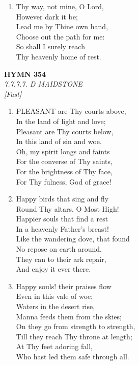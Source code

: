 \begin{enumerate}
    \item Thy way, not mine, O Lord, \\
        However dark it be; \\
        Lead me by Thine own hand, \\
        Choose out the path for me: \\
        So shall I surely reach \\
        Thy heavenly home of rest.

\end{enumerate}

\newpage
\begin{center}
    {\Large \textbf{HYMN 354}}
    \\
    \textit{7.7.7.7. D MAIDSTONE}
    \\
    \textit{\small [Fast]}
\end{center}
\vspace{1em}

\begin{enumerate}
    \item PLEASANT are Thy courts above, \\
        In the land of light and love; \\
        Pleasant are Thy courts below, \\
        In this land of sin and woe. \\
        Oh, my spirit longs and faints \\
        For the converse of Thy saints, \\
        For the brightness of Thy face, \\
        For Thy fulness, God of grace!

    \item Happy birds that sing and fly \\
        Round Thy altars, O Most High! \\
        Happier souls that find a rest \\
        In a heavenly Father's breast! \\
        Like the wandering dove, that found \\
        No repose on earth around, \\
        They can to their ark repair, \\
        And enjoy it ever there.

    \item Happy souls! their praises flow \\
        Even in this vale of woe; \\
        Waters in the desert rise, \\
        Manna feeds them from the skies; \\
        On they go from strength to strength, \\
        Till they reach Thy throne at length; \\
        At Thy feet adoring fall, \\
        Who hast led them safe through all.

\end{enumerate}

